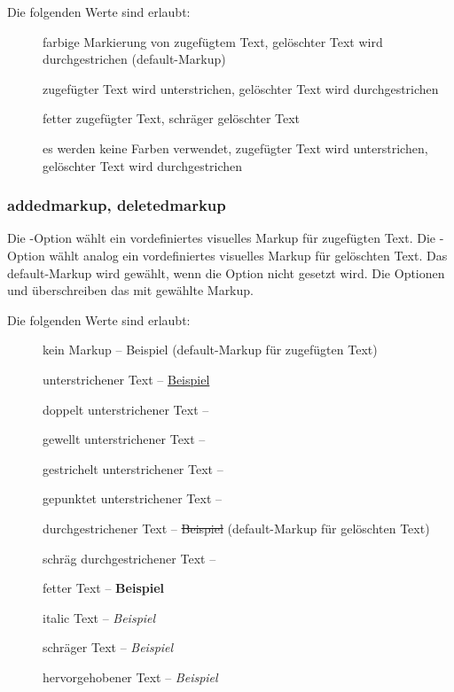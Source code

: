 Die folgenden Werte sind erlaubt:
\begin{description}
	\item [] farbige Markierung von zugefügtem Text, gelöschter Text wird durchgestrichen (default-Markup)
	\item [] zugefügter Text wird unterstrichen, gelöschter Text wird durchgestrichen
	\item [] fetter zugefügter Text, schräger gelöschter Text
	\item [] es werden keine Farben verwendet, zugefügter Text wird unterstrichen, gelöschter Text wird durchgestrichen
\end{description}



\subsubsection{addedmarkup, deletedmarkup}

Die -Option wählt ein vordefiniertes visuelles Markup für zugefügten Text.
Die -Option wählt analog ein vordefiniertes visuelles Markup für gelöschten Text.
Das default-Markup wird gewählt, wenn die Option nicht gesetzt wird.
Die Optionen  und  überschreiben das mit  gewählte Markup.

Die folgenden Werte sind erlaubt:
\begin{description}
	\item [] kein Markup -- Beispiel (default-Markup für zugefügten Text)
	\item [] unterstrichener Text -- \uline{Beispiel}
	\item [] doppelt unterstrichener Text -- 
	\item [] gewellt unterstrichener Text -- 
	\item [] gestrichelt unterstrichener Text -- 
	\item [] gepunktet unterstrichener Text -- 
	\item [] durchgestrichener Text -- \sout{Beispiel} (default-Markup für gelöschten Text)
	\item [] schräg durchgestrichener Text -- 
	\item [] fetter Text -- \textbf{Beispiel}
	\item [] italic Text -- \textit{Beispiel}
	\item [] schräger Text -- \textsl{Beispiel}
	\item [] hervorgehobener Text -- \emph{Beispiel}
\end{description}

